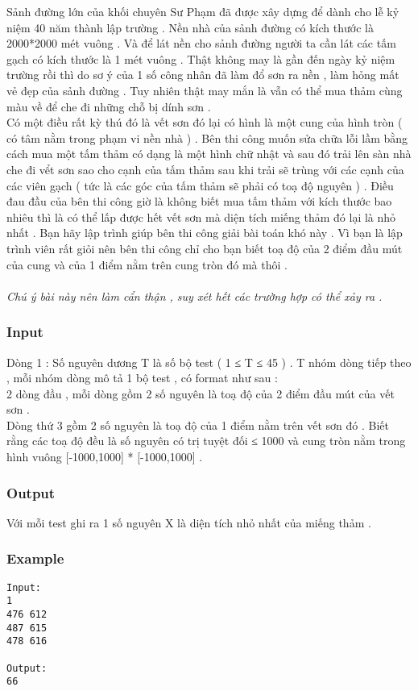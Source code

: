 



   Sảnh đường lớn của khối chuyên Sư Phạm đã được xây dựng để dành cho lễ kỷ niệm 40 năm thành lập trường . Nền nhà của sảnh đường có kích thước là 2000*2000 mét vuông . Và để lát nền cho sảnh đường người ta cần lát các tấm gạch có kích thước là 1 mét vuông . Thật không may là gần đến ngày kỷ niệm trường rồi thì do sơ ý của 1 số công nhân đã làm đổ sơn ra nền , làm hỏng mất vẻ đẹp của sảnh đường . Tuy nhiên thật may mắn là vẫn có thể mua thảm cùng màu về để che đi những chỗ bị dính sơn .   
\\   Có một điều rất kỳ thú đó là vết sơn đó lại có hình là một cung của hình tròn ( có tâm nằm trong phạm vi nền nhà ) . Bên thi công muốn sửa chữa lỗi lầm bằng cách mua một tấm thảm có dạng là một hình chữ nhật và sau đó trải lên sàn nhà che đi vểt sơn sao cho cạnh của tấm thảm sau khi trải sẽ trùng với các cạnh của các viên gạch ( tức là các góc của tấm thảm sẽ phải có toạ độ nguyên ) . Điều đau đầu của bên thi công giờ là không biết mua tấm thảm với kích thước bao nhiêu thì là có thể lấp được hết vết sơn mà diện tích miếng thảm đó lại là nhỏ nhất . Bạn hãy lập trình giúp bên thi công giải bài toán khó này . Vì bạn là lập trình viên rất giỏi nên bên thi công chỉ cho bạn biết toạ độ của 2 điểm đầu mút của cung và của 1 điểm nằm trên cung tròn đó mà thôi .   
\\
\\\textit{    Chú ý bài này nên làm cẩn thận , suy xét hết các trường hợp có thể xảy ra .   }

\subsubsection{   Input  }

   Dòng 1 : Số nguyên dương T là số bộ test ( 1 ≤ T ≤ 45 ) . T nhóm dòng tiếp theo , mỗi nhóm dòng mô tả 1 bộ test , có format như sau :   
\\   2 dòng đầu , mỗi dòng gồm 2 số nguyên là toạ độ của 2 điểm đầu mút của vết sơn .   
\\   Dòng thứ 3 gồm 2 số nguyên là toạ độ của 1 điểm nằm trên vết sơn đó . Biết rằng các toạ độ đều là số nguyên có trị tuyệt đối ≤ 1000 và cung tròn nằm trong hình vuông [-1000,1000] * [-1000,1000] .  

\subsubsection{   Output  }

   Với mỗi test ghi ra 1 số nguyên X là diện tích nhỏ nhất của miếng thảm .  

\subsubsection{   Example  }
\begin{verbatim}
Input:
1
476 612
487 615
478 616

Output:
66
\end{verbatim}